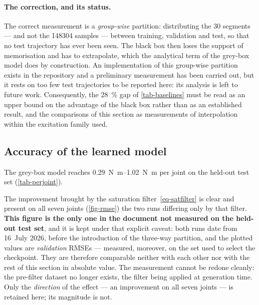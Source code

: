 \documentclass[a4paper, oneside]{article}
\begin{document}
\paragraph{The correction, and its status.} The correct measurement is a
\emph{group-wise} partition: distributing the \num{30} segments --- and not the
\num{148304} samples --- between training, validation and test, so that no test
trajectory has ever been seen. The black box then loses the support of
memorisation and has to extrapolate, which the analytical term of the grey-box
model does by construction. An implementation of this group-wise partition
exists in the repository and a preliminary measurement has been carried out,
but it rests on too few test trajectories to be reported here: its analysis is
left to future work. Consequently, the \SI{28}{\percent} gap of
\cref{tab-baselines} must be read as an upper bound on the advantage of the
black box rather than as an established result, and the comparisons of this
section as measurements of interpolation within the excitation family used.

\subsection{Accuracy of the learned model}
\label{sec-res-stage1}

The grey-box model reaches \SIrange{0.29}{1.02}{\newton\meter} per joint on the
held-out test set (\cref{tab-perjoint}).

The improvement brought by the saturation filter~\eqref{eq-satfilter} is clear
and present on all seven joints (\cref{fig-rmse})
the two runs differing only by that filter.
\textbf{This figure is the only one in the document not measured on the held-out
test set}, and it is kept under that explicit caveat: both runs date from
16~July 2026, before the introduction of the three-way partition, and the
plotted values are \emph{validation} RMSEs --- measured, moreover, on the set
used to select the checkpoint. They are therefore comparable neither with each
other nor with the rest of this section in absolute value. The measurement
cannot be redone cleanly: the pre-filter dataset no longer exists, the filter
being applied at generation time. Only the \emph{direction} of the effect ---
an improvement on all seven joints --- is retained here; its magnitude is not.
\end{document}
